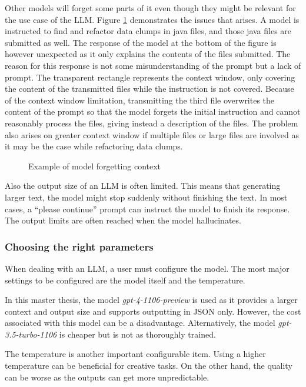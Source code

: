 Other models will forget some parts of it even though they might be relevant for the use case of the \ac{LLM}. Figure \ref{fig:llm_loose_context} demonstrates the issues that arises.  A model is instructed to find and refactor data clumps in java files, and those java files are submitted as well. The response of the model at the bottom of the figure is however unexpected as it only explains the contents of the files submitted. The reason for this response is not some misunderstanding of the prompt but a lack of prompt. The transparent rectangle represents the context window, only covering the content of the transmitted files while the instruction is not covered. 
Because of the context window limitation, transmitting the third file overwrites the content of the prompt so that the model forgets the initial instruction and cannot reasonably process the files, giving instead a description of the files. The problem also arises on greater context window if multiple files or large files are involved as it may be the case while refactoring data clumps.

\begin{figure}[ht!]
    \centering
    
    \caption{Example of model forgetting context}
    \label{fig:llm_loose_context}
\end{figure}

Also the output size of an \ac{LLM} is often limited. This means that generating larger text, the model might stop suddenly without finishing the text. In most cases, a \enquote{please continue} prompt can instruct the model to finish its response. The output limits are often reached when the model hallucinates. 
\subsubsection{Choosing the right parameters}
When dealing with an \ac{LLM}, a user must configure the model. The most major settings to be configured are the model itself and the temperature.

In this master thesis, the model \textit{gpt-4-1106-preview} is used as it provides a larger context  and output size and supports outputting in \ac{JSON} only. However, the cost associated with this model can be a disadvantage. Alternatively, the model \textit{gpt-3.5-turbo-1106} is cheaper but is not as thoroughly trained. 

The temperature is another important configurable item. Using a higher temperature can be beneficial for creative tasks. On the other hand, the quality can be worse as the outputs can get more unpredictable. 





